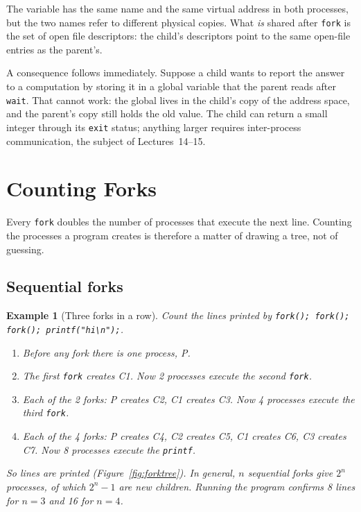 \documentclass[11pt]{article}
\newtheorem{example}{Example}
\begin{document}
The variable has the same name and the same virtual address in both
processes, but the two names refer to different physical copies. What
\emph{is} shared after \texttt{fork} is the set of open file descriptors: the
child's descriptors point to the same open-file entries as the parent's.

A consequence follows immediately. Suppose a child wants to report the answer
to a computation by storing it in a global variable that the parent reads
after \texttt{wait}. That cannot work: the global lives in the child's copy of
the address space, and the parent's copy still holds the old value. The child
can return a small integer through its \texttt{exit} status; anything larger
requires inter-process communication, the subject of Lectures~14--15.

\section{Counting Forks}

Every \texttt{fork} doubles the number of processes that execute the next
line. Counting the processes a program creates is therefore a matter of
drawing a tree, not of guessing.

\subsection{Sequential forks}

\begin{example}[Three forks in a row]
\label{ex:three}
Count the lines printed by
\texttt{fork(); fork(); fork(); printf("hi\textbackslash n");}.
\begin{enumerate}
  \item Before any fork there is one process, P.
  \item The first \texttt{fork} creates C1. Now 2 processes execute the
    second \texttt{fork}.
  \item Each of the 2 forks: P creates C2, C1 creates C3. Now 4 processes
    execute the third \texttt{fork}.
  \item Each of the 4 forks: P creates C4, C2 creates C5, C1 creates C6, C3
    creates C7. Now 8 processes execute the \texttt{printf}.
\end{enumerate}
So  lines are printed (Figure~\ref{fig:forktree}). In general, $n$
sequential forks give $2^n$ processes, of which $2^n - 1$ are new children.
Running the program confirms 8 lines for $n=3$ and 16 for $n=4$.
\end{example}
\end{document}

